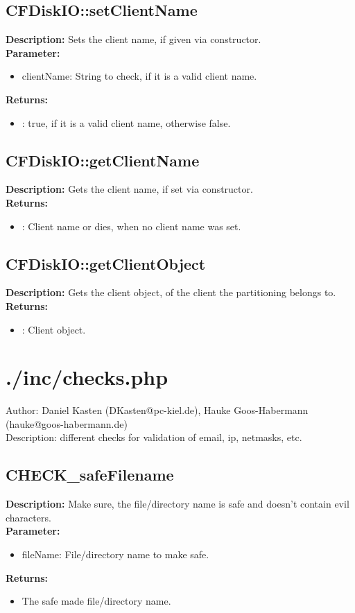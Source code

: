 \subsection{CFDiskIO::setClientName}
\textbf{Description:} Sets the client name, if given via constructor.\\
\textbf{Parameter:}
\begin{itemize}
\item clientName: String to check, if it is a valid client name.
\end{itemize}
\textbf{Returns:}
\begin{itemize}
\item : true, if it is a valid client name, otherwise false.
\end{itemize}

\subsection{CFDiskIO::getClientName}
\textbf{Description:} Gets the client name, if set via constructor.\\
\textbf{Returns:}
\begin{itemize}
\item : Client name or dies, when no client name was set.
\end{itemize}

\subsection{CFDiskIO::getClientObject}
\textbf{Description:} Gets the client object, of the client the partitioning belongs to.\\
\textbf{Returns:}
\begin{itemize}
\item : Client object.
\end{itemize}

\newpage\section{./inc/checks.php}
 Author: Daniel Kasten (DKasten@pc-kiel.de), Hauke Goos-Habermann (hauke@goos-habermann.de)\\
 Description: different checks for validation of email, ip, netmasks, etc.\\

\subsection{CHECK\_safeFilename}
\textbf{Description:} Make sure, the file/directory name is safe and doesn't contain evil characters.\\
\textbf{Parameter:}
\begin{itemize}
\item fileName: File/directory name to make safe.
\end{itemize}
\textbf{Returns:}
\begin{itemize}
\item The safe made file/directory name.
\end{itemize}

